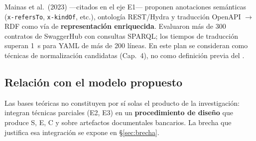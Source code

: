 Mainas et al.\ (2023) ---citados en el eje E1--- proponen anotaciones semánticas
(\texttt{x-refersTo}, \texttt{x-kindOf}, etc.), ontología REST/Hydra y traducción OpenAPI
$\rightarrow$ RDF como vía de \textbf{representación enriquecida}. Evaluaron más de 300 contratos de
SwaggerHub con consultas SPARQL; los tiempos de traducción superan 1~s para YAML de más de 200
líneas. En este plan se consideran como técnicas de normalización candidatas (Cap.~4), no como
definición previa del \SemanticScore{}.

\subsection{Relación con el modelo propuesto}

Las bases teóricas no constituyen por sí solas el producto de la investigación: integran técnicas
parciales (E2, E3) en un \textbf{procedimiento de diseño} que produce S, E, C y \AlignmentScore{}
sobre artefactos documentales bancarios. La brecha que justifica esa integración se expone en
§\ref{sec:brecha}.
